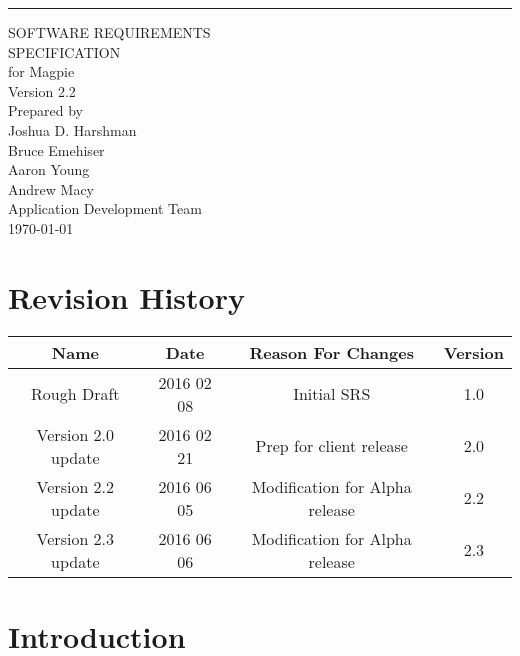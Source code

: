 \documentclass{scrreprt}
\date{}
\def\myversion{2.2 }
\begin{document}
\begin{flushright}
    \rule{16cm}{5pt}\vskip1cm
    \begin{bfseries}
        \Huge{SOFTWARE REQUIREMENTS\\ SPECIFICATION}\\
        \vspace{1.0cm}
        for Magpie \\
        \vspace{1cm}
        \LARGE{Version \myversion}\\
        \vspace{1.5cm}
        Prepared by\\Joshua D. Harshman\\Bruce Emehiser\\Aaron Young\\Andrew Macy\\
        \vspace{1.9cm}
        Application Development Team\\
        \vspace{1.9cm}
        \today\\
    \end{bfseries}
\end{flushright}

\tableofcontents

\chapter*{Revision History}

\begin{center}
    \begin{tabular}{|c|c|c|c|}
        \hline
	    Name & Date & Reason For Changes & Version \\
        \hline
	    Rough Draft & 2016 02 08 & Initial SRS & 1.0 \\
        \hline
        Version 2.0 update & 2016 02 21 & Prep for client release & 2.0 \\
        \hline
        Version 2.2 update & 2016 06 05 & Modification for Alpha release & 2.2 \\
        \hline
        Version 2.3 update & 2016 06 06 & Modification for Alpha release & 2.3 \\
        \hline
    \end{tabular}
\end{center}

\chapter{Introduction}
\end{document}
